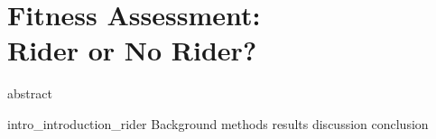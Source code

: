 \chapter{Fitness Assessment:\\ Rider or No Rider?}
\label{chapter:rider}
\glsresetall
{abstract}



\clearpage
{intro_introduction_rider}
{Background}
{methods}
{results}
{discussion}
{conclusion}

